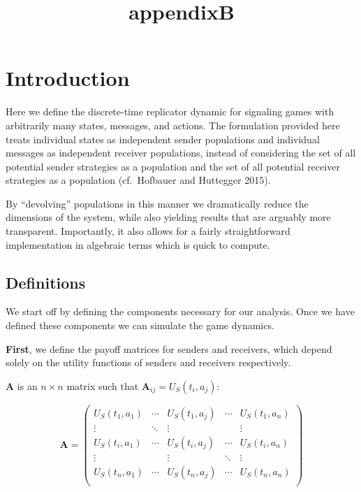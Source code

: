 \documentclass{article}
\title{appendixB}
\begin{document}
    
    
    \maketitle
    
    

    
    \section{Introduction}\label{introduction}

    Here we define the discrete-time replicator dynamic for signaling games
with arbitrarily many states, messages, and actions. The formulation
provided here treats individual states as independent sender populations
and individual messages as independent receiver populations, instead of
considering the set of all potential sender strategies as a population
and the set of all potential receiver strategies as a population
(cf.~Hofbauer and Huttegger 2015).

By ``devolving'' populations in this manner we dramatically reduce the
dimensions of the system, while also yielding results that are arguably
more transparent. Importantly, it also allows for a fairly
straightforward implementation in algebraic terms which is quick to
compute.

    \subsection{Definitions}\label{definitions}

    We start off by defining the components necessary for our analysis. Once
we have defined these components we can simulate the game dynamics.

    \textbf{First}, we define the payoff matrices for senders and receivers,
which depend solely on the utility functions of senders and receivers
respectively.

$\textbf{A}$ is an $n \times n$ matrix such that
$\textbf{A}_{ij} = U_S(t_i, a_j)$:

\begin{equation}
\textbf{A} =
 \begin{pmatrix}
  U_S(t_1, a_1) & \cdots & U_S(t_1, a_j) & \cdots & U_S(t_1, a_n) \\
  \vdots            & \ddots & \vdots           &           & \vdots \\
  U_S(t_i, a_1) & \cdots & U_S(t_i, a_j) & \cdots & U_S(t_i, a_n) \\  
  \vdots            &  & \vdots           &   \ddots        & \vdots \\
  U_S(t_n, a_1) & \cdots & U_S(t_n, a_j)  & \cdots & U_S(t_n, a_n) \\
 \end{pmatrix}
\end{equation}
\end{document}
